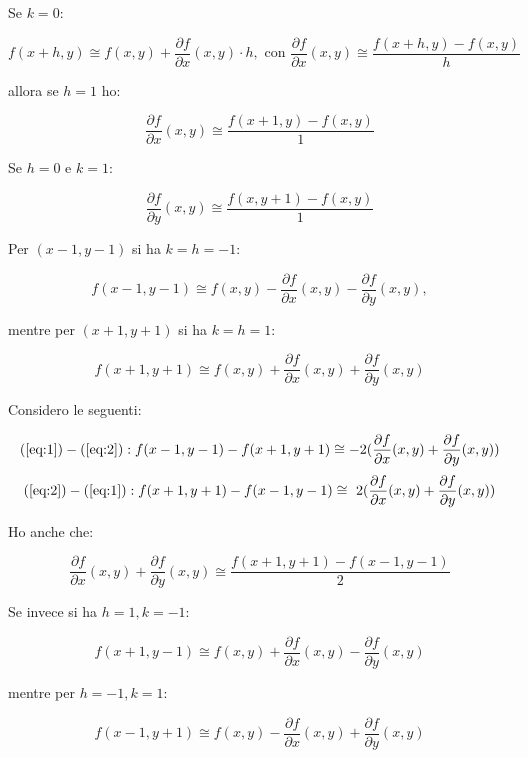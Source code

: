 \documentclass[a4paper,12pt]{article}
\begin{document}
	Se $k = 0$:

	\[
	f(x+h,y) \cong f(x,y) + \frac{\partial f}{\partial x}(x,y) \cdot h, \text{ con } \frac{\partial f}{\partial x} (x,y) \cong \frac{f(x + h,y) - f(x,y)}{h}
	\]

	allora se $h = 1$ ho:

	\[
	\frac{\partial f}{\partial x} (x,y) \cong \frac{f(x + 1,y) - f(x,y)}{1}
	\]

	Se $h = 0$ e $k = 1$:

	\[
	\frac{\partial f}{\partial y}(x,y) \cong \frac{f(x, y + 1) - f(x,y)}{1}
	\]

	Per $(x - 1, y -1 )$ si ha $k = h = -1$:

	\begin{equation}
		f(x - 1, y - 1) \cong f(x,y) - \frac{\partial f}{\partial x}(x,y) - \frac{\partial f}{\partial y}(x,y),
	\label{eq:1}
	\end{equation}


	mentre per $(x + 1, y + 1)$ si ha $k = h = 1$:

	\begin{equation}
		f(x + 1, y + 1) \cong f(x,y) + \frac{\partial f}{\partial x}(x,y) + \frac{\partial f}{\partial y}(x,y)
	\label{eq:2}
	\end{equation}

	Considero le seguenti:

	\[
	(\ref{eq:1}) - (\ref{eq:2}) : f(x-1,y-1) - f(x + 1, y+1) \cong -2(\frac{\partial f}{\partial x}(x,y) + \frac{\partial f}{\partial y}(x,y))
	\]
	\[
	(\ref{eq:2}) - (\ref{eq:1}) : f(x+1,y+1) - f(x - 1, y-1) \cong \ 2(\frac{\partial f}{\partial x}(x,y) + \frac{\partial f}{\partial y}(x,y))
	\]

	Ho anche che:

	\[
	\frac{\partial f}{\partial x}(x,y) + \frac{\partial f}{\partial y}(x,y) \cong \frac{f(x+1,y+1) - f(x-1,y-1)}{2}
	\]

	Se invece si ha $h = 1, k = -1$:

	\begin{equation}
		f(x + 1, y -1) \cong f(x,y) + \frac{\partial f}{\partial x}(x,y) - \frac{\partial f}{\partial y}(x,y)
	\label{eq:3}
	\end{equation}

	mentre per $h = -1, k = 1$:

	\begin{equation}
		f(x-1,y+1) \cong f(x,y) - \frac{\partial f}{\partial x}(x,y) + \frac{\partial f}{\partial y}(x,y)
	\label{eq:4}
	\end{equation}

\end{document}
